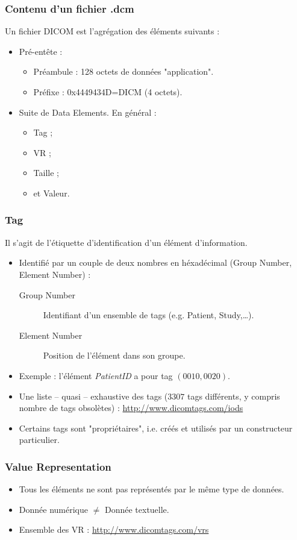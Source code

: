 \frame
{
	\frametitle{Contenu d'un fichier .dcm}
	
	Un fichier DICOM est l'agr\'egation des \'el\'ements suivants :
	\begin{itemize}
		\item Pr\'e-ent\^ete :
		\begin{itemize}
			\item Pr\'eambule : 128 octets de donn\'ees "application".
			\item Pr\'efixe : 0x4449434D=DICM (4 octets).
		\end{itemize}
		\item Suite de Data Elements.
		En g\'en\'eral :
		\begin{itemize}
			\item Tag ;
			\item VR ;
			\item Taille ;
			\item et Valeur.
		\end{itemize}
	\end{itemize}
}

\frame
{
	\frametitle{Tag}

	Il s'agit de l'\'etiquette d'identification d'un \'el\'ement d'information.
	\begin{itemize}
		\item Identifi\'e par un couple de deux nombres en h\'exad\'ecimal (Group Number, Element Number) :
			\begin{description}
				\item[Group Number] Identifiant d'un ensemble de tags (e.g. Patient, Study,\ldots).
				\item[Element Number] Position de l'\'el\'ement dans son groupe.
			\end{description}
		\item Exemple : l'\'el\'ement \emph{PatientID} a pour tag $(0010,0020)$.
		\item Une liste -- quasi -- exhaustive des tags ($3307$ tags diff\'erents, y compris nombre de tags obsol\`etes) : \url{http://www.dicomtags.com/iods}
		\item Certains tags sont "propri\'etaires", i.e. cr\'e\'es et utilis\'es par un constructeur particulier.
	\end{itemize}
}

\frame
{
	\frametitle{Value Representation}

	\begin{itemize}
		\item Tous les \'el\'ements ne sont pas repr\'esent\'es par le m\^eme type de donn\'ees.
		\item Donn\'ee num\'erique $\neq$ Donn\'ee textuelle.
		\item Ensemble des VR : \url{http://www.dicomtags.com/vrs}
	\end{itemize}
}

